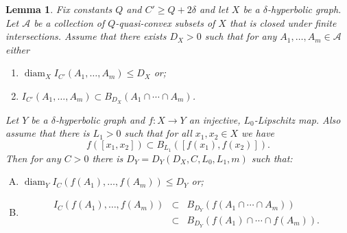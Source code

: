 \documentclass[11pt]{article}
\newtheorem{lemma}[thm]{Lemma}
\theoremstyle{remark}
\def\diam{\operatorname{diam}}
\def\A{{\mathcal A}}
\begin{document}
\begin{lemma}
Fix constants $Q$ and $C' \ge Q+2\delta$ and let $X$ be a $\delta$-hyperbolic graph. Let $\A$ be a collection of $Q$-quasi-convex subsets of $X$ that is closed under finite intersections. Assume that there exists $D_X>0$ such that for any $A_1, \dots, A_m \in \A$ either
\begin{enumerate}[(1)]
\item $\diam_X I_{C'}(A_1,\dots, A_m) \le D_X$ or;
\item $I_{C'}(A_1, \dots, A_m) \subset B_{D_X}(A_1\cap \cdots \cap  A_m)$.
\end{enumerate}
Let $Y$ be a $\delta$-hyperbolic graph and $f\colon X\to Y$ an injective, $L_0$-Lipschitz map. Also assume that there is $L_1 >0$ such that  for all $x_1, x_2 \in X$ we have
$$f([x_1,x_2]) \subset B_{L_1}([f(x_1), f(x_2)]).$$
Then for any $C>0$ there is $D_Y = D_Y(D_X,C, L_0, L_1,m)$  such that:
\begin{enumerate}[(A)]
\item $\diam_Y I_C(f(A_1),  \dots, f(A_m)) \le D_Y$ or;

\item  \begin{eqnarray*}
I_C(f(A_1), \dots, f(A_m)) & \subset& B_{D_Y}(f(A_1\cap \cdots \cap A_m)) \\ &\subset& B_{D_Y}(f(A_1)\cap \cdots \cap  f(A_m)).
\end{eqnarray*}
\end{enumerate}
\end{lemma}
\end{document}
